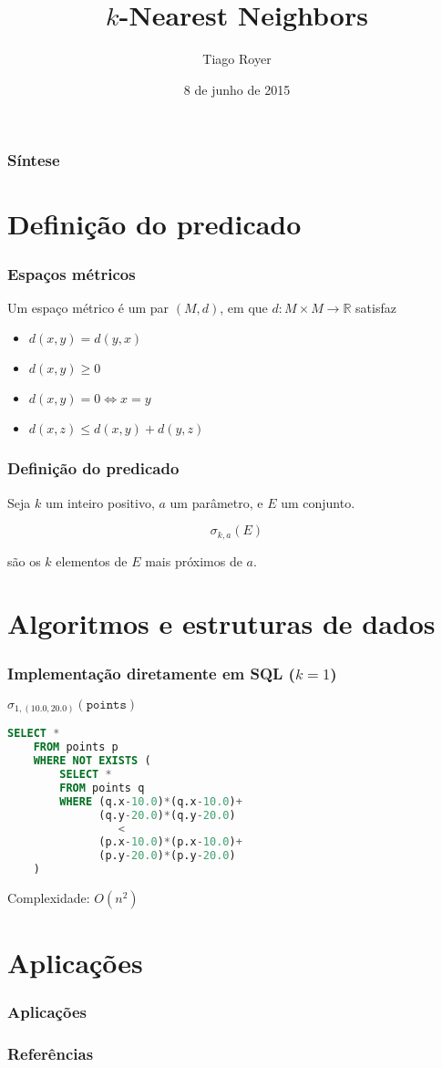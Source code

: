\documentclass[utf8]{beamer}
\begin{document}
\author{Tiago Royer}
\title{$k$-Nearest Neighbors}
\date{8 de junho de 2015}
\begin{frame}
    \titlepage
\end{frame}

\begin{frame}
    \frametitle{Síntese}
    \tableofcontents
\end{frame}

\section{Definição do predicado}

\begin{frame}
    \frametitle{Espaços métricos}

    Um espaço métrico é um par $(M, d)$,
    em que $d : M \times M \rightarrow \mathbb R$ satisfaz

    \begin{itemize}
        \item $d(x, y) = d(y, x)$
        \item $d(x, y) \geq 0$
        \item $d(x, y) = 0 \Longleftrightarrow x = y$
        \item $d(x, z) \leq d(x, y) + d(y, z)$
    \end{itemize}
\end{frame}

\begin{frame}
    \frametitle{Definição do predicado}

    Seja $k$ um inteiro positivo,
    $a$ um parâmetro,
    e $E$ um conjunto.

    \begin{equation*}
        \sigma_{k, a}(E)
    \end{equation*}

    são os $k$ elementos de $E$ mais próximos de $a$.
    \nocite{two-kNN-predicates}
\end{frame}

\section{Algoritmos e estruturas de dados}

\begin{frame}[fragile]
    \frametitle{Implementação diretamente em SQL ($k = 1$)}

    $\sigma_{1, (10.0, 20.0)}(\texttt{points})$
    \begin{lstlisting}[language=SQL]
    SELECT *
    FROM points p
    WHERE NOT EXISTS (
        SELECT *
        FROM points q
        WHERE (q.x-10.0)*(q.x-10.0)+
              (q.y-20.0)*(q.y-20.0)
                 <
              (p.x-10.0)*(p.x-10.0)+
              (p.y-20.0)*(p.y-20.0)
    )
    \end{lstlisting}

    \pause
    Complexidade: $O(n^2)$
\end{frame}

\section{Aplicações}
\begin{frame}
    \frametitle{Aplicações}
\end{frame}

\begin{frame}
    \frametitle{Referências}
    
    
\end{frame}
\end{document}
